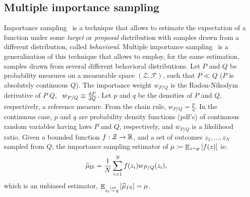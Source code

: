 \documentclass{article}
\begin{document}
\subsection{Multiple importance sampling}
Importance sampling~\citep{cochran2007sampling,mcbook} is a technique that allows to estimate the expectation of a function under some \textit{target} or \textit{proposal} distribution with samples drawn from a different distribution, called \textit{behavioral}. Multiple importance sampling~\citep{veach_optimally_1995} is a generalization of this technique that allows to employ, for the same estimation, samples drawn from several different behavioral distributions. Let $P$ and $Q$ be probability measures on a measurable space $(\mathcal{Z}, \mathcal{F})$, such that $P\ll Q$ (\ie $P$ is absolutely continuous \wrt $Q$). The importance weight $w_{P/Q}$ is the Radon-Nikodym derivative of $P$ \wrt $Q$, \ie~$w_{P/Q} \equiv \frac{\mathrm{d} P}{\mathrm{d} Q}$. Let $p$ and $q$ be the densities of $P$ and $Q$, respectively, \wrt a reference measure. From the chain rule, $w_{P/Q} = \frac{p}{q}$. In the continuous case, $p$ and $q$ are probability density functions (pdf's) of continuous random variables having laws $P$ and $Q$, respectively, and $w_{P/Q}$ is a likelihood ratio. 
Given a bounded function $f:\mathcal{Z}\to\mathbb{R}$, and a set of \iid outcomes $z_1,\dots,z_N$ sampled from $Q$, the importance sampling estimator of $\mu\coloneqq\mathop{\mathbb{E}}_{z\sim p}\left[f(z)\right]$ is:
\begin{align}\label{eq:ise}
	\widehat{\mu}_{\text{IS}} = \frac{1}{N}\sum_{i=1}^{N}f(z_i)w_{P/Q}(z_i),
\end{align}
which is an unbiased estimator, \ie ${\mathop{\mathbb{E}}_{z_i\stackrel{iid}{\sim} q}\left[\widehat{\mu}_{IS}\right] = \mu}$. 
\end{document}
